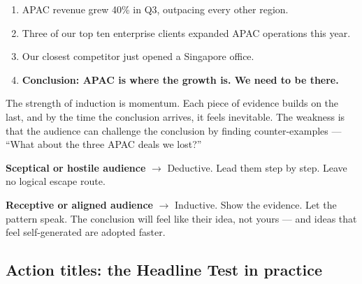 \begin{keybox}
\begin{enumerate}[leftmargin=1.5em]
  \item APAC revenue grew 40\% in Q3, outpacing every other region.
  \item Three of our top ten enterprise clients expanded APAC operations this year.
  \item Our closest competitor just opened a Singapore office.
  \item \textbf{Conclusion: APAC is where the growth is. We need to be there.}
\end{enumerate}
\end{keybox}

The strength of induction is momentum. Each piece of evidence builds on the last, and by the time the conclusion arrives, it feels inevitable. The weakness is that the audience can challenge the conclusion by finding counter-examples --- ``What about the three APAC deals we lost?''

\begin{insightbox}
\textbf{Sceptical or hostile audience} $\to$ Deductive. Lead them step by step. Leave no logical escape route.

\textbf{Receptive or aligned audience} $\to$ Inductive. Show the evidence. Let the pattern speak. The conclusion will feel like their idea, not yours --- and ideas that feel self-generated are adopted faster.
\end{insightbox}



\subsection{Action titles: the Headline Test in practice}

